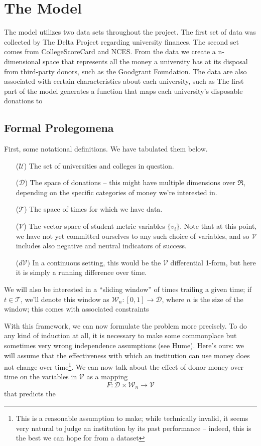 \documentclass[paper.tex]{subfiles}
\newcommand{\U}{\mathcal{U}}
\newcommand{\D}{\mathcal{D}}
\newcommand{\V}{\mathcal{V}}
\newcommand{\T}{\mathcal{T}}
\newcommand{\W}{\mathcal{W}}
\begin{document}
	\section{The Model}
	The model utilizes two data sets throughout the project. The first set of data was collected by The Delta Project \cite{desrochers2010trends} regarding university finances. The second set comes from CollegeScoreCard and NCES. From the data we create a n-dimensional space that represents all the money a university has at its disposal from third-party donors, such as the Goodgrant Foundation. The data are also associated with certain characteristics about each university, such as  The first part of the model generates a function that maps each university's disposable donations to 
	
	\subsection{Formal Prolegomena}
	
	First, some notational definitions. We have tabulated them below. 
	
	\begin{itemize}
		\item[($\U$)] The set of universities and colleges in question.
		\item[($\D$)] The space of donations -- this might have multiple dimensions over $\Re$, depending on the specific categories of money we're interested in. 
		\item[($\T$)] The space of times for which we have data. 
		\item[($\V$)] The vector space of student metric variables $\{v_i\}$. Note that at this point, we have not yet committed ourselves to any such choice of variables, and so $\V$ includes also negative and neutral indicators of success.
		\item[($d\V)$] In a continuous setting, this would be the $\V$ differential 1-form, but here it is simply a running difference over time.  
	\end{itemize}
	
	We will also be interested in a ``sliding window'' of times trailing a given time; if $t \in \T$, we'll denote this window as $\W_n : [0,1] \to \D$, where $n$ is the size of the window; this comes with associated constraints 
	
	With this framework, we can now formulate the problem more precisely. To do any kind of induction at all, it is necessary to make some commonplace but sometimes very wrong independence assumptions (see Hume). Here's ours: we will assume that the effectiveness with which an institution can use money does not change over time\footnote{This is a reasonable assumption to make; while technically invalid, it seems very natural to judge an institution by its past performance -- indeed, this is the best we can hope for from a dataset}. We can now talk about the effect of donor money over time on the variables in $\V$ as a mapping
	\begin{equation}
		F: \D \times \W_n \to \V
	\end{equation} 	
	that predicts the 
\end{document}
